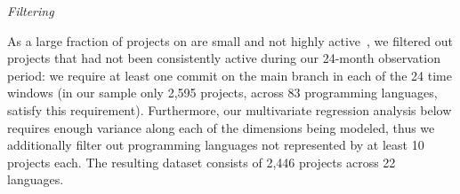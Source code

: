 \smallskip\noindent\emph{Filtering}

As a large fraction of projects on \GH are small and not highly 
active~\cite{gousios2014exploratory}, we filtered out projects that had not 
been consistently active during our 24-month observation period: we require
at least one commit on the main branch in each of the 24 time windows 
(in our sample only 2,595 projects, across 83 programming languages, satisfy 
this requirement).
Furthermore, our multivariate regression analysis below requires enough 
variance along each of the dimensions being modeled, thus we additionally
filter out programming languages not represented by at least 10 projects each.
The resulting dataset consists of 2,446 projects across 22 languages.



%

%





